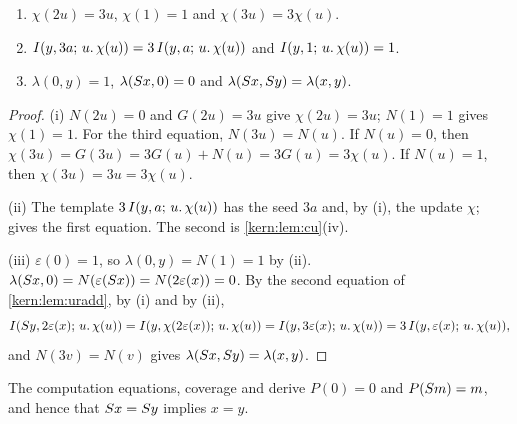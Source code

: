 \begin{lemma}
\label{kern:lem:comparator}
\begin{enumerate}[label=\textup{(\roman*)}]
\item $\chi(2u)=3u$, $\chi(1)=1$ and $\chi(3u)=3\chi(u)$.
\item $I(y,3a;\,u.\,\chi(u))=3\,I(y,a;\,u.\,\chi(u))$ and
 $I(y,1;\,u.\,\chi(u))=1$.
\item $\lambda(0,y)=1$, $\lambda(S x,0)=0$ and
 $\lambda(S x,S y)=\lambda(x,y)$.
\end{enumerate}
\end{lemma}

\begin{proof}
(i) $N(2u)=0$ and $G(2u)=3u$ give $\chi(2u)=3u$; $N(1)=1$ gives
$\chi(1)=1$.  For the third equation, $N(3u)=N(u)$.  If $N(u)=0$, then
$\chi(3u)=G(3u)=3G(u)+N(u)=3G(u)=3\chi(u)$.  If $N(u)=1$, then
$\chi(3u)=3u=3\chi(u)$.

(ii) The template $3\,I(y,a;\,u.\,\chi(u))$ has the seed $3a$ and, by (i),
the update $\chi$;  gives the first equation.  The second is
\cref{kern:lem:cu}(iv).

(iii) $\varepsilon(0)=1$, so $\lambda(0,y)=N(1)=1$ by (ii).
$\lambda(S x,0)=N(\varepsilon(S x))=N(2\varepsilon(x))=0$.  By the
second equation of \cref{kern:lem:uradd}, by (i) and by (ii),
\[
 I(S y,2\varepsilon(x);\,u.\,\chi(u))
 =I(y,\chi(2\varepsilon(x));\,u.\,\chi(u))
 =I(y,3\varepsilon(x);\,u.\,\chi(u))
 =3\,I(y,\varepsilon(x);\,u.\,\chi(u)),
\]
and $N(3v)=N(v)$ gives $\lambda(S x,S y)=\lambda(x,y)$.
\end{proof}

\begin{theorem}
\label{kern:thm:urpred}
The computation equations, coverage and  derive $P(0)=0$ and
$P(S m)=m$, and hence that $S x=S y$ implies $x=y$.
\end{theorem}

